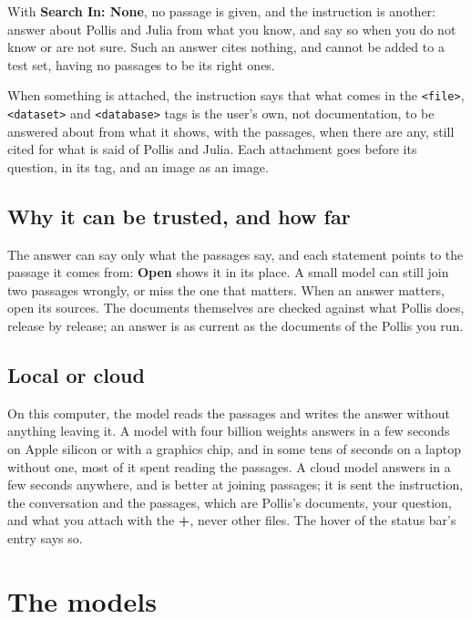 With \textbf{Search In: None}, no passage is given, and the instruction is another: answer about Pollis and Julia
from what you know, and say so when you do not know or are not sure. Such an answer cites nothing, and cannot be added
to a test set, having no passages to be its right ones.

When something is attached, the instruction says that what comes in the \texttt{<file>}, \texttt{<dataset>} and
\texttt{<database>} tags is the user's own, not documentation, to be answered about from what it shows, with the
passages, when there are any, still cited for what is said of Pollis and Julia. Each attachment goes before its question, in its tag, and
an image as an image.

\subsection{Why it can be trusted, and how far}
The answer can say only what the passages say, and each statement points to the passage it comes from: \textbf{Open}
shows it in its place. A small model can still join two passages wrongly, or miss the one that matters. When an answer
matters, open its sources. The documents themselves are checked against what Pollis does, release by release; an answer
is as current as the documents of the Pollis you run.

\subsection{Local or cloud}
On this computer, the model reads the passages and writes the answer without anything leaving it. A model with four
billion weights answers in a few seconds on Apple silicon or with a graphics chip, and in some tens of seconds on a
laptop without one, most of it spent reading the passages. A cloud model answers in a few seconds anywhere, and is
better at joining passages; it is sent the instruction, the conversation and the passages, which are Pollis's documents,
your question, and what you attach with the \textbf{+}, never other files. The hover of the status bar's entry says so.

\section{The models}\label{sec:models}

